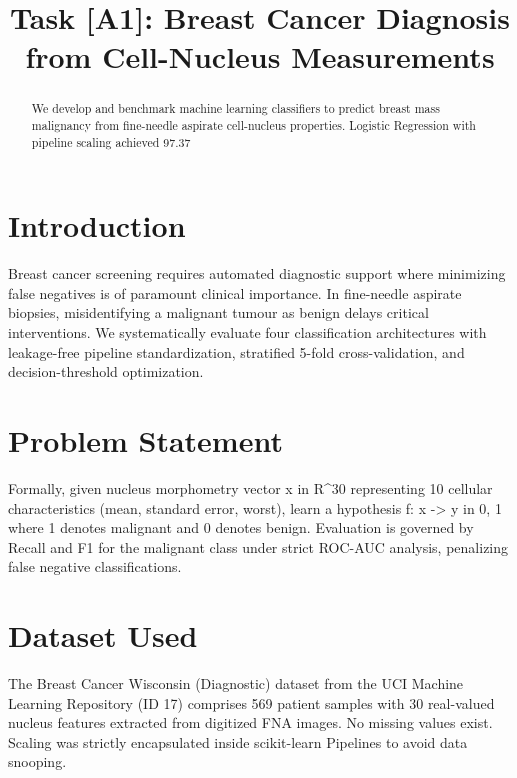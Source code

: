 \documentclass[conference]{IEEEtran}
\begin{document}
\title{Task [A1]: Breast Cancer Diagnosis from Cell-Nucleus Measurements}

\author{
}

\maketitle

\begin{abstract}
We develop and benchmark machine learning classifiers to predict breast mass malignancy from fine-needle aspirate cell-nucleus properties. Logistic Regression with pipeline scaling achieved 97.37%
\end{abstract}

\section{Introduction}
Breast cancer screening requires automated diagnostic support where minimizing false negatives is of paramount clinical importance. In fine-needle aspirate biopsies, misidentifying a malignant tumour as benign delays critical interventions. We systematically evaluate four classification architectures with leakage-free pipeline standardization, stratified 5-fold cross-validation, and decision-threshold optimization.

\section{Problem Statement}
Formally, given nucleus morphometry vector x in R^30 representing 10 cellular characteristics (mean, standard error, worst), learn a hypothesis f: x -> y in {0, 1} where 1 denotes malignant and 0 denotes benign. Evaluation is governed by Recall and F1 for the malignant class under strict ROC-AUC analysis, penalizing false negative classifications.

\section{Dataset Used}
The Breast Cancer Wisconsin (Diagnostic) dataset from the UCI Machine Learning Repository (ID 17) comprises 569 patient samples with 30 real-valued nucleus features extracted from digitized FNA images. No missing values exist. Scaling was strictly encapsulated inside scikit-learn Pipelines to avoid data snooping.
\end{document}
